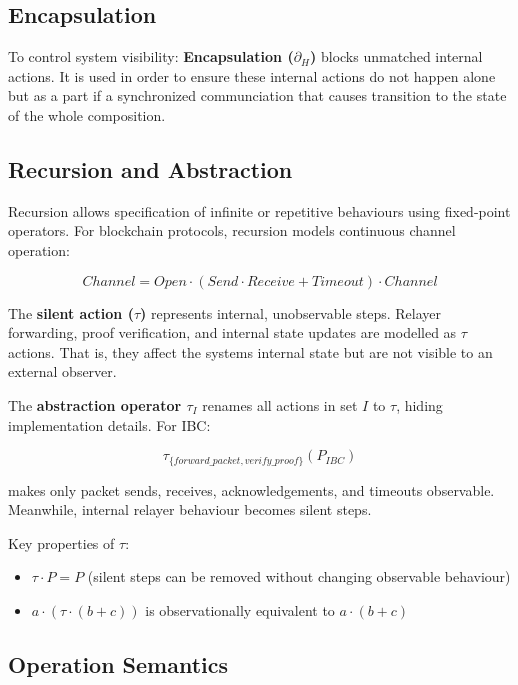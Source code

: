 \subsection{Encapsulation}\label{encapsulation}

To control system visibility: \textbf{Encapsulation (\(\partial_H\))}
blocks unmatched internal actions. It is used in order to ensure these
internal actions do not happen alone but as a part if a synchronized
communciation that causes transition to the state of the whole
composition.

\subsection{Recursion and Abstraction}\label{recursion-and-abstraction}

Recursion allows specification of infinite or repetitive behaviours
using fixed-point operators. For blockchain protocols, recursion models
continuous channel operation:

\[
Channel = Open \cdot (Send \cdot Receive + Timeout) \cdot Channel
\]

The \textbf{silent action (\(\tau\))} represents internal, unobservable
steps. Relayer forwarding, proof verification, and internal state
updates are modelled as \(\tau\) actions. That is, they affect the
system\textquotesingle s internal state but are not visible to an
external observer.

The \textbf{abstraction operator \(\tau_I\)} renames all actions in set
\(I\) to \(\tau\), hiding implementation details. For IBC:

\[
\tau_{\{forward\_packet, verify\_proof\}}(P_{IBC})
\]

makes only packet sends, receives, acknowledgements, and timeouts
observable. Meanwhile, internal relayer behaviour becomes silent steps.

Key properties of \(\tau\):

\begin{itemize}
    \item \(\tau \cdot P = P\) (silent steps can be removed without changing observable behaviour)
    \item \(a \cdot (\tau \cdot (b + c))\) is observationally equivalent to \(a \cdot (b + c)\)
\end{itemize}

\subsection{Operation Semantics}\label{operation-semantics}

